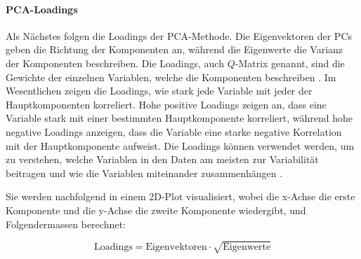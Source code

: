 \newpage

\paragraph{PCA-Loadings}

Als Nächstes folgen die Loadings der PCA-Methode. Die Eigenvektoren der PCs geben die Richtung der Komponenten an, während die Eigenwerte die Varianz der Komponenten beschreiben.
Die Loadings, auch $Q$-Matrix genannt, sind die Gewichte der einzelnen Variablen, welche die Komponenten beschreiben \cite[p.~434]{abdi_principal_2010}.
Im Wesentlichen zeigen die Loadings, wie stark jede Variable mit jeder der Hauptkomponenten korreliert. Hohe positive Loadings zeigen an, dass eine Variable stark mit einer bestimmten Hauptkomponente korreliert, während hohe negative Loadings anzeigen, dass die Variable eine starke negative Korrelation mit der Hauptkomponente aufweist.
Die Loadings können verwendet werden, um zu verstehen, welche Variablen in den Daten am meisten zur Variabilität beitragen und wie die Variablen miteinander zusammenhängen \cite[p.~438]{abdi_principal_2010}.

Sie werden nachfolgend in einem 2D-Plot visualisiert, wobei die x-Achse die erste Komponente und die y-Achse die zweite Komponente wiedergibt, und Folgendermassen berechnet:

\begin{equation}
    \label{eq:loadings}
    \text{Loadings} = \text{Eigenvektoren} \cdot \sqrt{\text{Eigenwerte}}
\end{equation}

